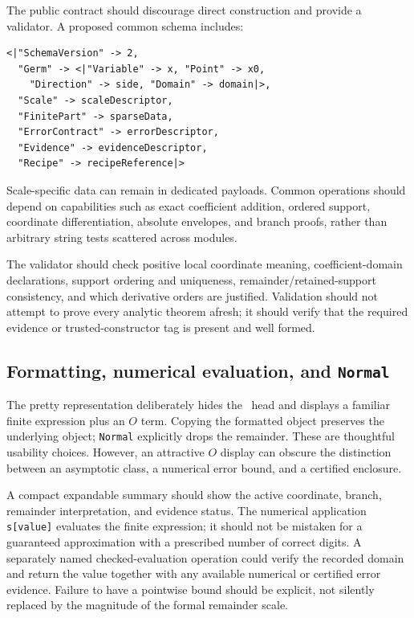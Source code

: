 The public contract should discourage direct construction and provide a validator. A proposed common schema includes:
\begin{lstlisting}
<|"SchemaVersion" -> 2,
  "Germ" -> <|"Variable" -> x, "Point" -> x0,
    "Direction" -> side, "Domain" -> domain|>,
  "Scale" -> scaleDescriptor,
  "FinitePart" -> sparseData,
  "ErrorContract" -> errorDescriptor,
  "Evidence" -> evidenceDescriptor,
  "Recipe" -> recipeReference|>
\end{lstlisting}
Scale-specific data can remain in dedicated payloads. Common operations should depend on capabilities such as exact coefficient addition, ordered support, coordinate differentiation, absolute envelopes, and branch proofs, rather than arbitrary string tests scattered across modules.

The validator should check positive local coordinate meaning, coefficient-domain declarations, support ordering and uniqueness, remainder/retained-support consistency, and which derivative orders are justified. Validation should not attempt to prove every analytic theorem afresh; it should verify that the required evidence or trusted-constructor tag is present and well formed.

\subsection{Formatting, numerical evaluation, and \texttt{Normal}}

The pretty representation deliberately hides the \gseries\ head and displays a familiar finite expression plus an $O$ term. Copying the formatted object preserves the underlying object; \texttt{Normal} explicitly drops the remainder. These are thoughtful usability choices. However, an attractive $O$ display can obscure the distinction between an asymptotic class, a numerical error bound, and a certified enclosure.\cite{guide}

A compact expandable summary should show the active coordinate, branch, remainder interpretation, and evidence status. The numerical application \texttt{s[value]} evaluates the finite expression; it should not be mistaken for a guaranteed approximation with a prescribed number of correct digits. A separately named checked-evaluation operation could verify the recorded domain and return the value together with any available numerical or certified error evidence. Failure to have a pointwise bound should be explicit, not silently replaced by the magnitude of the formal remainder scale.

